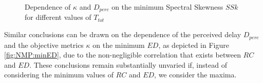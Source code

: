 \begin{figure}[!tb]
\begin{flushright}
    \hfil
\end{flushright}
\caption{Dependence of $\kappa$ and $D_{perc}$ on the minimum Spectral Skewness $SSk$ for different values of $T_{tot}$}
\label{fig:NMP:minSSk}
\end{figure}

Similar conclusions can be drawn on the dependence of the perceived delay $D_{perc}$ and the objective metrics $\kappa$ on the minimum $ED$, as depicted in Figure \ref{fig:NMP:minED}, due to the non-negligible correlation that exists between $RC$ and $ED$. 
These conclusions remain substantially unvaried if, instead of considering the minimum values of $RC$ and $ED$, we consider the maxima.

